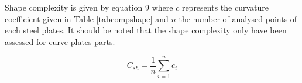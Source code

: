 Shape complexity is given by equation 9 where $c$ represents the curvature coefficient given in Table \ref{tabcompshape} and $n$ the number of analysed points of each steel plates. It should be noted that the shape complexity only have been assessed for curve plates parts.


\begin{equation}
C_{sh} = \frac{1}{n} \sum_{i=1}^{n} c_i
\end{equation}